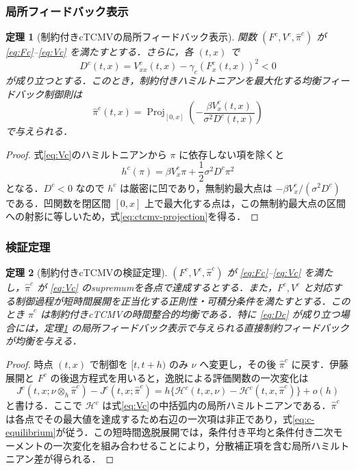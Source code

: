\documentclass[10pt,a4paper]{article}
\theoremstyle{plain}
\newtheorem{theorem}{定理}
\theoremstyle{definition}
\DeclareMathOperator{\Proj}{Proj}
\newcommand{\Hamil}{\mathcal{H}}
\begin{document}
\subsubsection{局所フィードバック表示}

\begin{theorem}[制約付きcTCMVの局所フィードバック表示]
\label{thm:ctcmv-projection}
関数 $(F^c,V^c,\hat\pi^c)$ が \eqref{eq:Fc}--\eqref{eq:Vc} を満たすとする．さらに，各 $(t,x)$ で
\begin{equation}
  D^c(t,x)=V_{xx}^c(t,x)-\gamma_c(F_x^c(t,x))^2<0
  \label{eq:Dc}
\end{equation}
が成り立つとする．このとき，制約付きハミルトニアンを最大化する均衡フィードバック制御則は
\begin{equation}
  \boxed{
  \hat\pi^c(t,x)=
  \Proj_{[0,x]}
  \left(
  -\frac{\beta V_x^c(t,x)}{\sigma^2D^c(t,x)}
  \right)
  }
  \label{eq:ctcmv-projection}
\end{equation}
で与えられる．
\end{theorem}

\begin{proof}
式\eqref{eq:Vc}のハミルトニアンから $\pi$ に依存しない項を除くと
\[
 h^c(\pi)=\beta V_x^c\pi+\frac12\sigma^2D^c\pi^2
\]
となる．$D^c<0$ なので $h^c$ は厳密に凹であり，無制約最大点は $-\beta V_x^c/(\sigma^2D^c)$ である．凹関数を閉区間 $[0,x]$ 上で最大化する点は，この無制約最大点の区間への射影に等しいため，式\eqref{eq:ctcmv-projection}を得る．
\end{proof}

\subsubsection{検証定理}

\begin{theorem}[制約付きcTCMVの検証定理]
\label{thm:ctcmv-verification}
$(F^c,V^c,\hat\pi^c)$ が \eqref{eq:Fc}--\eqref{eq:Vc} を満たし，$\hat\pi^c$ が \eqref{eq:Vc} のsupremumを各点で達成するとする．また，$F^c,V^c$ と対応する制御過程が短時間展開を正当化する正則性・可積分条件を満たすとする．このとき $\hat\pi^c$ は制約付きcTCMVの時間整合的均衡である．特に \eqref{eq:Dc} が成り立つ場合には，定理\ref{thm:ctcmv-projection} の局所フィードバック表示で与えられる直接制約フィードバックが均衡を与える．
\end{theorem}

\begin{proof}
時点 $(t,x)$ で制御を $[t,t+h)$ のみ $\nu$ へ変更し，その後 $\hat\pi^c$ に戻す．伊藤展開と $F^c$ の後退方程式を用いると，逸脱による評価関数の一次変化は
\[
 J^c(t,x;\nu\otimes_h\hat\pi^c)-J^c(t,x;\hat\pi^c)
 =h\{\Hamil^c(t,x,\nu)-\Hamil^c(t,x,\hat\pi^c)\}+o(h)
\]
と書ける．ここで $\Hamil^c$ は式\eqref{eq:Vc}の中括弧内の局所ハミルトニアンである．$\hat\pi^c$ は各点でその最大値を達成するため右辺の一次項は非正であり，式\eqref{eq:c-equilibrium}が従う．この短時間逸脱展開では，条件付き平均と条件付き二次モーメントの一次変化を組み合わせることにより，分散補正項を含む局所ハミルトニアン差が得られる．
\end{proof}
\end{document}
